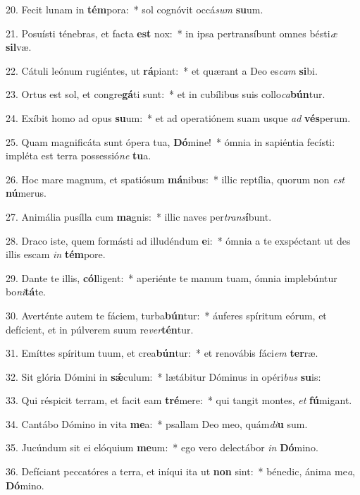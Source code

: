 20. Fecit lunam in \textbf{tém}pora:~*  sol cognóvit occá\textit{sum} \textbf{su}um.\

21. Posuísti ténebras, et facta \textbf{est} nox:~*  in ipsa pertransíbunt omnes bésti\textit{æ} \textbf{sil}væ.\

22. Cátuli leónum rugiéntes, ut \textbf{rá}piant:~*  et quærant a Deo es\textit{cam} \textbf{si}bi.\

23. Ortus est sol, et congre\textbf{gá}ti sunt:~*  et in cubílibus suis collo\textit{ca}\textbf{bún}tur.\

24. Exíbit homo ad opus \textbf{su}um:~*  et ad operatiónem suam usque \textit{ad} \textbf{vés}perum.\

25. Quam magnificáta sunt ópera tua, \textbf{Dó}mine!~*  ómnia in sapiéntia fecísti: impléta est terra possessió\textit{ne} \textbf{tu}a.\

26. Hoc mare magnum, et spatiósum \textbf{má}nibus:~*  illic reptília, quorum non \textit{est} \textbf{nú}merus.\

27. Animália pusílla cum \textbf{ma}gnis:~*  illic naves per\textit{trans}\textbf{í}bunt.\

28. Draco iste, quem formásti ad illudéndum \textbf{e}i:~*  ómnia a te exspéctant ut des illis escam \textit{in} \textbf{tém}pore.\

29. Dante te illis, \textbf{cól}ligent:~*  aperiénte te manum tuam, ómnia implebúntur bo\textit{ni}\textbf{tá}te.\

30. Averténte autem te fáciem, turba\textbf{bún}tur:~*  áuferes spíritum eórum, et defícient, et in púlverem suum re\textit{ver}\textbf{tén}tur.\

31. Emíttes spíritum tuum, et crea\textbf{bún}tur:~*  et renovábis fáci\textit{em} \textbf{ter}ræ.\

32. Sit glória Dómini in \textbf{sǽ}culum:~*  lætábitur Dóminus in opéri\textit{bus} \textbf{su}is:\

33. Qui réspicit terram, et facit eam \textbf{tré}mere:~*  qui tangit montes, \textit{et} \textbf{fú}migant.\

34. Cantábo Dómino in vita \textbf{me}a:~*  psallam Deo meo, quám\textit{di}\textbf{u} sum.\

35. Jucúndum sit ei elóquium \textbf{me}um:~*  ego vero delectábor \textit{in} \textbf{Dó}mino.\

36. Defíciant peccatóres a terra, et iníqui ita ut \textbf{non} sint:~*  bénedic, ánima me\textit{a}, \textbf{Dó}mino.\

